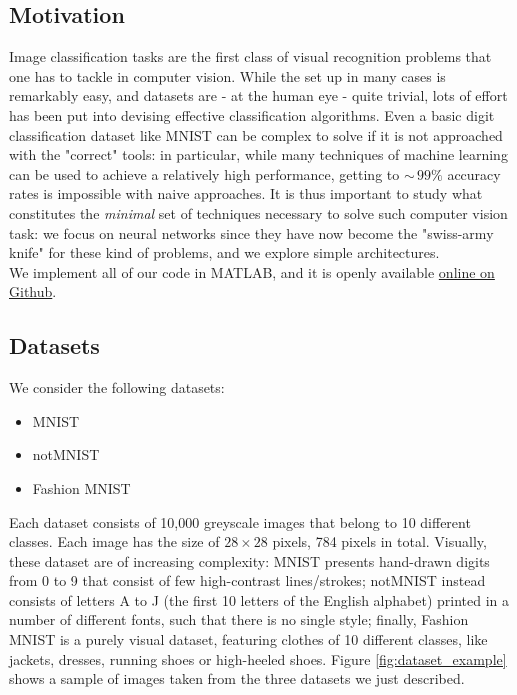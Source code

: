 \documentclass[letterpaper,12pt]{article}
\begin{document}
\subsection*{Motivation}
Image classification tasks are the first class of visual recognition problems that one has to tackle in computer vision. While the set up in many cases is remarkably easy, and datasets are - at the human eye - quite trivial, lots of effort has been put into devising effective classification algorithms. Even a basic digit classification dataset like MNIST can be complex to solve if it is not approached with the "correct" tools: in particular, while many techniques of machine learning can be used to achieve a relatively high performance, getting to $\sim\,99\%$ accuracy rates is impossible with naive approaches. It is thus important to study what constitutes the \textit{minimal} set of techniques necessary to solve such computer vision task: we focus on neural networks since they have now become the "swiss-army knife" for these kind of problems, and we explore simple architectures.\\

We implement all of our code in MATLAB, and it is openly available \href{https://github.com/giob1994/topics_adv_econometrics/tree/master/Project}{online on Github}.

\subsection*{Datasets}
We consider the following datasets:
	\vspace{1em}
	\begin{itemize}
		\item MNIST
		\item notMNIST
		\item Fashion MNIST
	\end{itemize}
	\vspace{1em}
Each dataset consists of 10,000 greyscale images that belong to 10 different classes. Each image has the size of $28\times28$ pixels, 784 pixels in total. Visually, these dataset are of increasing complexity: MNIST presents hand-drawn digits from 0 to 9 that consist of few high-contrast lines/strokes; notMNIST instead consists of letters A to J (the first 10 letters of the English alphabet) printed in a number of different fonts, such that there is no single style; finally, Fashion MNIST is a purely visual dataset, featuring clothes of 10 different classes, like jackets, dresses, running shoes or high-heeled shoes. Figure \ref{fig:dataset_example} shows a sample of images taken from the three datasets we just described.
\end{document}
